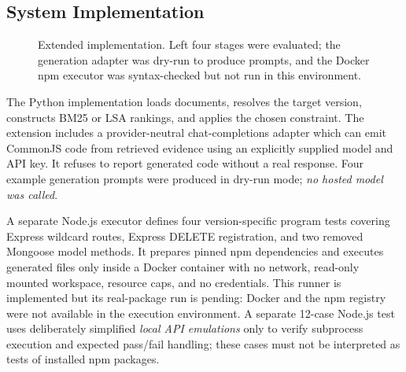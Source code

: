\documentclass[conference]{IEEEtran}
\begin{document}
\subsection{System Implementation}
\begin{figure}[t]
\centering
{}
\caption{Extended implementation. Left four stages were evaluated; the generation adapter was dry-run to produce prompts, and the Docker npm executor was syntax-checked but not run in this environment.}
\label{fig:workflow}
\end{figure}

The Python implementation loads documents, resolves the target version, constructs BM25 or LSA rankings, and applies the chosen constraint. The extension includes a provider-neutral chat-completions adapter which can emit CommonJS code from retrieved evidence using an explicitly supplied model and API key. It refuses to report generated code without a real response. Four example generation prompts were produced in dry-run mode; \emph{no hosted model was called}.

A separate Node.js executor defines four version-specific program tests covering Express wildcard routes, Express DELETE registration, and two removed Mongoose model methods. It prepares pinned npm dependencies and executes generated files only inside a Docker container with no network, read-only mounted workspace, resource caps, and no credentials. This runner is implemented but its real-package run is pending: Docker and the npm registry were not available in the execution environment. A separate 12-case Node.js test uses deliberately simplified \emph{local API emulations} only to verify subprocess execution and expected pass/fail handling; these cases must not be interpreted as tests of installed npm packages.
\end{document}
